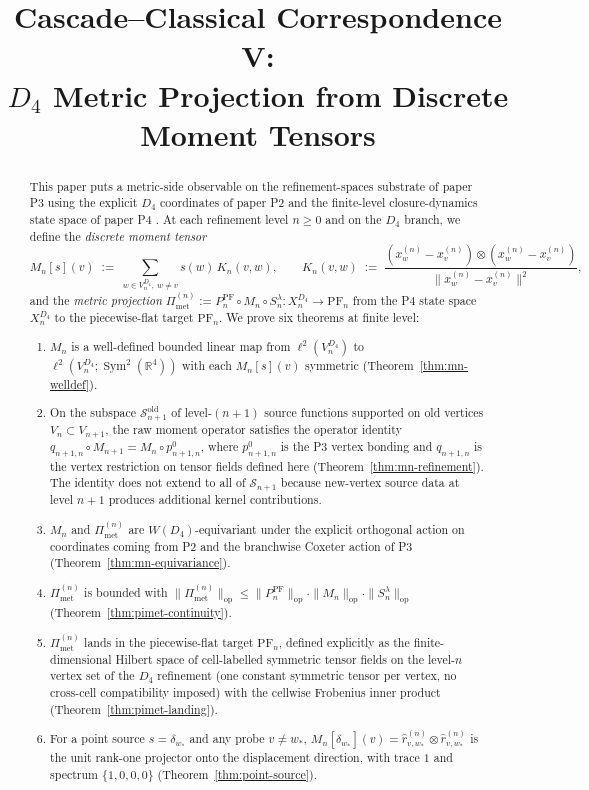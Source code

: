 \documentclass[11pt, a4paper]{amsart}
\title{Cascade--Classical Correspondence V:\\
  $D_4$ Metric Projection from Discrete Moment Tensors}
\author{}
\date{}
\theoremstyle{definition}
\newcommand{\R}{\mathbb{R}}
\newcommand{\op}{\operatorname{op}}
\newcommand{\Sym}{\operatorname{Sym}}
\newcommand{\Met}{\mathrm{met}}
\newcommand{\PF}{\mathrm{PF}}
\newcommand{\Pimet}{\Pi_{\Met}}
\begin{document}
\maketitle

\begin{abstract}
This paper puts a metric-side observable on the refinement-spaces
substrate of paper P3 \cite{RefinementSpaces} using the explicit
$D_4$ coordinates of paper P2 \cite{AlgebraicSubstrate} and the
finite-level closure-dynamics state space of paper P4
\cite{ClosureDynamics}. At each refinement level $n \geq 0$ and on
the $D_4$ branch, we define the \emph{discrete moment tensor}
\[
  M_n[s](v) \;:=\; \sum_{w \in V_n^{D_4},\ w \neq v} s(w)\,
    K_n(v, w), \qquad
  K_n(v, w) \;:=\; \frac{(x_w^{(n)} - x_v^{(n)}) \otimes
      (x_w^{(n)} - x_v^{(n)})}{\|x_w^{(n)} - x_v^{(n)}\|^2},
\]
and the \emph{metric projection}
$\Pimet^{(n)} := P_n^\PF \circ M_n \circ S_n^\lambda \colon X_n^{D_4} \to
\PF_n$ from the P4 state space $X_n^{D_4}$ to the piecewise-flat
target $\PF_n$. We prove six theorems at finite level:

\begin{enumerate}
\item[(T1)] $M_n$ is a well-defined bounded linear map from
  $\ell^2(V_n^{D_4})$ to
  $\ell^2(V_n^{D_4}; \Sym^2(\R^4))$ with each
  $M_n[s](v)$ symmetric (Theorem~\ref{thm:mn-welldef}).
\item[(T2)] On the subspace
  $\mathcal S_{n+1}^{\mathrm{old}}$ of level-$(n+1)$ source
  functions supported on old vertices $V_n \subset V_{n+1}$, the
  raw moment operator satisfies the operator identity
  $q_{n+1, n} \circ M_{n+1} = M_n \circ p_{n+1, n}^0$, where
  $p_{n+1, n}^0$ is the P3 vertex bonding and $q_{n+1, n}$ is the
  vertex restriction on tensor fields defined here
  (Theorem~\ref{thm:mn-refinement}). The identity does not extend
  to all of $\mathcal S_{n+1}$ because new-vertex source data at
  level $n+1$ produces additional kernel contributions.
\item[(T3)] $M_n$ and $\Pimet^{(n)}$ are $W(D_4)$-equivariant
  under the explicit orthogonal action on coordinates coming
  from P2 and the branchwise Coxeter action of P3
  (Theorem~\ref{thm:mn-equivariance}).
\item[(T4)] $\Pimet^{(n)}$ is bounded with
  $\|\Pimet^{(n)}\|_\op \leq \|P_n^\PF\|_\op \cdot \|M_n\|_\op
  \cdot \|S_n^\lambda\|_\op$ (Theorem~\ref{thm:pimet-continuity}).
\item[(T5)] $\Pimet^{(n)}$ lands in the piecewise-flat target
  $\PF_n$, defined explicitly as the finite-dimensional Hilbert
  space of cell-labelled symmetric tensor fields on the
  level-$n$ vertex set of the $D_4$ refinement (one constant
  symmetric tensor per vertex, no cross-cell compatibility
  imposed) with the cellwise Frobenius inner product
  (Theorem~\ref{thm:pimet-landing}).
\item[(T6)] For a point source $s = \delta_{w_\ast}$ and any probe
  $v \neq w_\ast$, $M_n[\delta_{w_\ast}](v) = \hat r_{v, w_\ast}^{(n)}
  \otimes \hat r_{v, w_\ast}^{(n)}$ is the unit rank-one projector
  onto the displacement direction, with trace $1$ and spectrum
  $\{1, 0, 0, 0\}$ (Theorem~\ref{thm:point-source}).
\end{enumerate}


\end{abstract}
\end{document}

